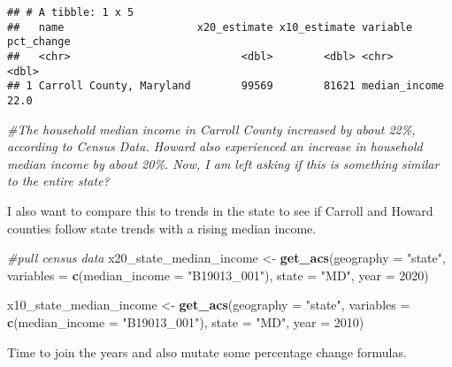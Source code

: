 \documentclass[
]{article}
\newenvironment{Shaded}{\begin{snugshade}}{\end{snugshade}}
\newcommand{\AttributeTok}[1]{\textcolor[rgb]{0.13,0.29,0.53}{#1}}
\newcommand{\CommentTok}[1]{\textcolor[rgb]{0.56,0.35,0.01}{\textit{#1}}}
\newcommand{\DecValTok}[1]{\textcolor[rgb]{0.00,0.00,0.81}{#1}}
\newcommand{\FunctionTok}[1]{\textcolor[rgb]{0.13,0.29,0.53}{\textbf{#1}}}
\newcommand{\NormalTok}[1]{#1}
\newcommand{\OtherTok}[1]{\textcolor[rgb]{0.56,0.35,0.01}{#1}}
\newcommand{\StringTok}[1]{\textcolor[rgb]{0.31,0.60,0.02}{#1}}
\begin{document}
\begin{verbatim}
## # A tibble: 1 x 5
##   name                     x20_estimate x10_estimate variable      pct_change
##   <chr>                           <dbl>        <dbl> <chr>              <dbl>
## 1 Carroll County, Maryland        99569        81621 median_income       22.0
\end{verbatim}

\begin{Shaded}
\begin{Highlighting}[]
\CommentTok{\#The household median income in Carroll County increased by about 22\%, according to Census Data. Howard also experienced an increase in household median income by about 20\%. Now, I am left asking if this is something similar to the entire state?}
\end{Highlighting}
\end{Shaded}

I also want to compare this to trends in the state to see if Carroll and
Howard counties follow state trends with a rising median income.

\begin{Shaded}
\begin{Highlighting}[]
\CommentTok{\#pull census data}
\NormalTok{x20\_state\_median\_income }\OtherTok{\textless{}{-}} \FunctionTok{get\_acs}\NormalTok{(}\AttributeTok{geography =} \StringTok{"state"}\NormalTok{,}
              \AttributeTok{variables =} \FunctionTok{c}\NormalTok{(}\AttributeTok{median\_income =} \StringTok{"B19013\_001"}\NormalTok{),}
              \AttributeTok{state =} \StringTok{"MD"}\NormalTok{,}
              \AttributeTok{year =} \DecValTok{2020}\NormalTok{) }

\NormalTok{x10\_state\_median\_income }\OtherTok{\textless{}{-}} \FunctionTok{get\_acs}\NormalTok{(}\AttributeTok{geography =} \StringTok{"state"}\NormalTok{,}
              \AttributeTok{variables =} \FunctionTok{c}\NormalTok{(}\AttributeTok{median\_income =} \StringTok{"B19013\_001"}\NormalTok{),}
              \AttributeTok{state =} \StringTok{"MD"}\NormalTok{,}
              \AttributeTok{year =} \DecValTok{2010}\NormalTok{)}
\end{Highlighting}
\end{Shaded}

Time to join the years and also mutate some percentage change formulas.
\end{document}
